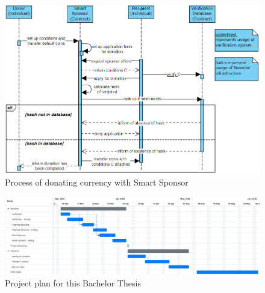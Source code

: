 \begin{figure}
    \centering
    \includegraphics[scale=0.55]{figures/Smart Sponsor.png}  
    \caption{Process of donating currency with Smart Sponsor}
    \label{fig:my_label}
\end{figure}
\begin{figure}
    \centering
    \includegraphics[scale=0.50]{figures/timeplan.PNG}  
    \caption{Project plan for this Bachelor Thesis}
    \label{fig:my_label}
\end{figure}
